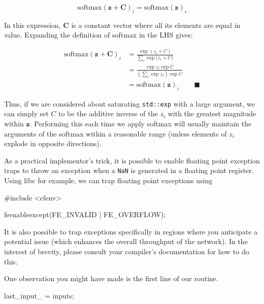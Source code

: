\documentclass[
]{article}
\newenvironment{Shaded}{}{}
\newcommand{\ImportTok}[1]{#1}
\newcommand{\NormalTok}[1]{#1}
\newcommand{\PreprocessorTok}[1]{\textcolor[rgb]{0.74,0.48,0.00}{#1}}
\newcommand{\VariableTok}[1]{\textcolor[rgb]{0.10,0.09,0.49}{#1}}
\begin{document}
\[\mathrm{softmax}(\mathbf{z} + \mathbf{C})_i = \mathrm{softmax}(\mathbf{z})_i\]

In this expression, \(\mathbf{C}\) is a constant vector where all its
elements are equal in value. Expanding the definition of softmax in the
LHS gives:

\[
\begin{aligned}
\mathrm{softmax}(\mathbf{z} + \mathbf{C})_i &= \frac{\exp{(z_i + C)}}{\sum_i\exp{(z_i + C})} \\
&= \frac
    {\exp{z_i}\exp{C}}
    {\left(\sum_i\exp{z_i}\right)\exp C} \\
&= \mathrm{softmax}(\mathbf{z})_i && \blacksquare
\end{aligned}
\]

Thus, if we are considered about saturating \texttt{std::exp} with a
large argument, we can simply set \(C\) to be the additive inverse of
the \(z_i\) with the greatest magnitude within \(\mathbf{z}\).
Performing this each time we apply softmax will usually maintain the
arguments of the softmax within a reasonable range (unless elements of
\(z_i\) explode in opposite directions).

As a practical implementor's trick, it is possible to enable floating
point exception traps to throw an exception when a \texttt{NaN} is
generated in a floating point register. Using libc for example, we can
trap floating point exceptions using

\begin{Shaded}
\begin{Highlighting}[]
\PreprocessorTok{\#include }\ImportTok{\textless{}cfenv\textgreater{}}

\NormalTok{feenableexcept(FE\_INVALID | FE\_OVERFLOW);}
\end{Highlighting}
\end{Shaded}

It is also possible to trap exceptions specifically in regions where you
anticipate a potential issue (which enhances the overall throughput of
the network). In the interest of brevity, please consult your compiler's
documentation for how to do this.

One observation you might have made is the first line of our routine.

\begin{Shaded}
\begin{Highlighting}[]
\VariableTok{last\_input\_}\NormalTok{ = inputs;}
\end{Highlighting}
\end{Shaded}
\end{document}
